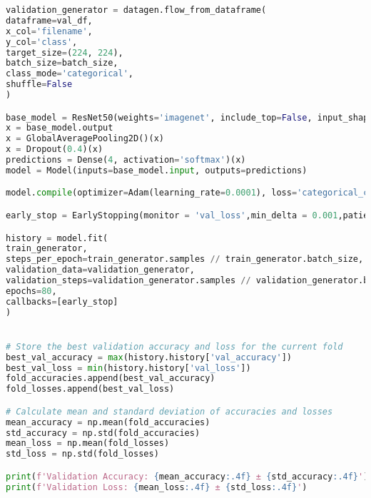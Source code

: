 \begin{lstlisting}[language=Python]
validation_generator = datagen.flow_from_dataframe(
dataframe=val_df,
x_col='filename',
y_col='class',
target_size=(224, 224),
batch_size=batch_size,
class_mode='categorical',
shuffle=False
)

base_model = ResNet50(weights='imagenet', include_top=False, input_shape=(224,224,3))
x = base_model.output
x = GlobalAveragePooling2D()(x)
x = Dropout(0.4)(x)
predictions = Dense(4, activation='softmax')(x)
model = Model(inputs=base_model.input, outputs=predictions)

model.compile(optimizer=Adam(learning_rate=0.0001), loss='categorical_crossentropy', metrics=['accuracy'])

early_stop = EarlyStopping(monitor = 'val_loss',min_delta = 0.001,patience = 20,mode = 'min',restore_best_weights = True,verbose = 1)

history = model.fit(
train_generator,
steps_per_epoch=train_generator.samples // train_generator.batch_size,
validation_data=validation_generator,
validation_steps=validation_generator.samples // validation_generator.batch_size,
epochs=80,
callbacks=[early_stop]
)


# Store the best validation accuracy and loss for the current fold
best_val_accuracy = max(history.history['val_accuracy'])
best_val_loss = min(history.history['val_loss'])
fold_accuracies.append(best_val_accuracy)
fold_losses.append(best_val_loss)

# Calculate mean and standard deviation of accuracies and losses
mean_accuracy = np.mean(fold_accuracies)
std_accuracy = np.std(fold_accuracies)
mean_loss = np.mean(fold_losses)
std_loss = np.std(fold_losses)

print(f'Validation Accuracy: {mean_accuracy:.4f} ± {std_accuracy:.4f}')
print(f'Validation Loss: {mean_loss:.4f} ± {std_loss:.4f}')
\end{lstlisting}

